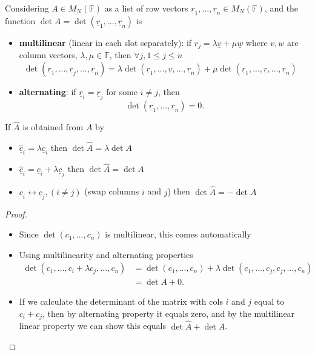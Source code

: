 \begin{corollary}
  Considering $A \in M_{N}(\mathbb{F})$ as a list of row vectors $\underline{r}_1,...,\underline{r}_n \in M_N(\mathbb{F})$, and the function $\det A = \det (\underline{r}_1,...,\underline{r}_n)$ is
    \begin{itemize}
      \item {\bf multilinear} (linear in each slot separately): if $r_j = \lambda \underline{v} + \mu \underline{w}$ where $v, w$ are column vectors, $\lambda, \mu \in \mathbb{F}$, then $\forall j, 1 \leq j \leq n$
        \[\det (\underline{r}_1, ..., \underline{r}_j, ..., \underline{r}_n) = \lambda \det(\underline{r}_1, ..., \underline{v},..., \underline{r}_n ) + \mu \det(\underline{r}_1, ..., \underline{r}, ..., \underline{r}_n) \quad \]
    \item {\bf alternating}: if $\underline{r}_i = \underline{r}_j$ for some $i \not = j$, then
        \[\det(\underline{r}_1,..., \underline{r}_n) = 0.\]
    \end{itemize}   
\end{corollary}

\begin{prop}
    If $\hat{A}$ is obtained from $A$ by
    \begin{itemize}
      \item $\underline{\hat{c}}_i = \lambda \underline{c}_i$ then $\det \hat{A} = \lambda \det A$
      \item $\underline{\hat{c}}_i =\underline{c}_i + \lambda \underline{c}_j$ then $\det \hat{A} = \det A$
      \item $\underline{c}_i \leftrightarrow \underline{c}_j, (i \not = j)$ (swap columns $i$ and $j$) then $\det \hat{A} = - \det A$
    \end{itemize}
\end{prop}
\begin{proof} $ $
    \begin{itemize}
      \item Since $\det(c_1,...,c_n)$ is multilinear, this comes automatically
      \item Using multilinearity and alternating properties
        \begin{align*}
          \det(c_1,...,c_i + \lambda c_j,...,c_n) &= \det(c_1,...,c_n) + \lambda \det(c_1,...,c_j, c_j,...,c_n) \\
                                                  &= \det A + 0
        .\end{align*}
      \item If we calculate the determinant of the matrix with cols $i$ and $j$ equal to $c_i + c_j$, then by alternating property it equals zero, and by the multilinear linear property we can show this equals $\det \hat{A} + \det A$.
    \end{itemize}
\end{proof}

